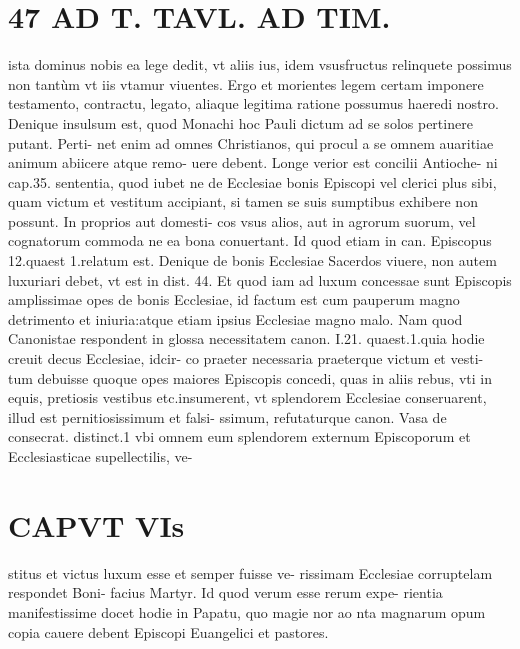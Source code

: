 \documentclass{article}
\begin{document}
\begin{pages}
\section*{47 AD T. TAVL. AD TIM. }\pstart ista dominus nobis ea lege dedit, vt aliis ius, idem vsusfructus relinquete possimus non tantùm vt iis vtamur viuentes. Ergo et morientes legem certam imponere testamento, contractu, legato, aliaque legitima ratione possumus haeredi nostro.  \pend\pstart Denique insulsum est, quod Monachi hoc Pauli dictum ad se solos pertinere putant. Perti- net enim ad omnes Christianos, qui procul a se omnem auaritiae animum abiicere atque remo- uere debent. Longe verior est concilii Antioche- ni cap.35. sententia, quod iubet ne de Ecclesiae bonis Episcopi vel clerici plus sibi, quam victum et vestitum accipiant, si tamen se suis sumptibus exhibere non possunt. In proprios aut domesti- cos vsus alios, aut in agrorum suorum, vel cognatorum commoda ne ea bona conuertant. Id quod etiam in can. Episcopus 12.quaest 1.relatum est. Denique  de bonis Ecclesiae Sacerdos viuere, non autem luxuriari debet, vt est in dist. 44. Et quod iam ad luxum concessae sunt Episcopis amplissimae opes de bonis Ecclesiae, id factum est cum pauperum magno detrimento et iniuria:atque etiam ipsius Ecclesiae magno malo. Nam quod Canonistae respondent in glossa necessitatem canon. I.21. quaest.1.quia hodie creuit decus Ecclesiae, idcir- co praeter necessaria praeterque victum et vesti- tum debuisse quoque opes maiores Episcopis concedi, quas in aliis rebus, vti in equis, pretiosis vestibus etc.insumerent, vt splendorem Ecclesiae conseruarent, illud est pernitiosissimum et falsi- ssimum, refutaturque canon. Vasa de consecrat. distinct.1 vbi omnem eum splendorem externum Episcoporum et Ecclesiasticae supellectilis, ve-  \pend
\section*{CAPVT  VIs }
\marginpar{[ p.445 ]}\pstart stitus et victus luxum esse et semper fuisse ve- rissimam Ecclesiae corruptelam respondet Boni- facius Martyr. Id quod verum esse rerum expe- rientia manifestissime docet hodie in Papatu, quo magie nor ao nta magnarum opum copia cauere debent Episcopi Euangelici et pastores.  \pend
{}
{}

\end{pages}
\end{document}
